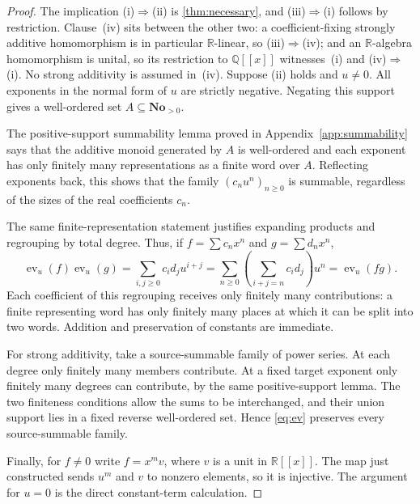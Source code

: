 \documentclass[11pt,letterpaper]{article}
\theoremstyle{definition}
\theoremstyle{remark}
\newcommand{\No}{\mathbf{No}}
\newcommand{\R}{\mathbb R}
\newcommand{\Q}{\mathbb Q}
\newcommand{\ev}{\operatorname{ev}}
\begin{document}
\begin{proof}
The implication (i)$\Rightarrow$(ii) is \cref{thm:necessary}, and
(iii)$\Rightarrow$(i) follows by restriction. Clause~(iv) sits between the
other two: a coefficient-fixing strongly additive homomorphism is in
particular $\R$-linear, so (iii)$\Rightarrow$(iv); and an $\R$-algebra
homomorphism is unital, so its restriction to $\Q[[x]]$ witnesses~(i) and
(iv)$\Rightarrow$(i). No strong additivity is assumed in~(iv). Suppose (ii) holds and $u\ne0$.
All exponents in the normal form of $u$ are strictly negative. Negating this
support gives a well-ordered set $A\subseteq\No_{>0}$.

The positive-support summability lemma proved in
Appendix~\ref{app:summability} says that the additive monoid generated by
$A$ is well-ordered and each exponent has only finitely many representations
as a finite word over $A$. Reflecting exponents back, this shows that the
family $(c_nu^n)_{n\ge0}$ is summable, regardless of the sizes of the real
coefficients $c_n$.

The same finite-representation statement justifies expanding products and
regrouping by total degree. Thus, if $f=\sum c_nx^n$ and $g=\sum d_nx^n$,
\[
 \ev_u(f)\ev_u(g)
 =\sum_{i,j\ge0}c_id_ju^{i+j}
 =\sum_{n\ge0}\left(\sum_{i+j=n}c_id_j\right)u^n
 =\ev_u(fg).
\]
Each coefficient of this regrouping receives only finitely many contributions:
a finite representing word has only finitely many places at which it can be
split into two words. Addition and preservation of constants are immediate.

For strong additivity, take a source-summable family of power series. At each
degree only finitely many members contribute. At a fixed target exponent only
finitely many degrees can contribute, by the same positive-support lemma.
The two finiteness conditions allow the sums to be interchanged, and their
union support lies in a fixed reverse well-ordered set. Hence \eqref{eq:ev}
preserves every source-summable family.

Finally, for $f\ne0$ write $f=x^m v$, where $v$ is a unit in $\R[[x]]$.
The map just constructed sends $u^m$ and $v$ to nonzero elements, so it is
injective. The argument for $u=0$ is the direct constant-term calculation.
\end{proof}
\end{document}
